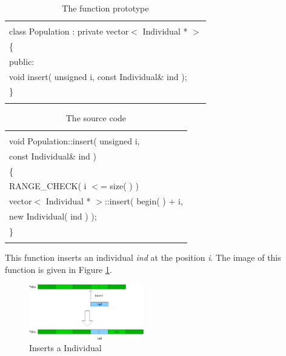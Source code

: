 \documentclass[twocolumn]{article}
\begin{document}
\begin{table}[h]
\begin{center}
\caption{The function prototype}
\label{FP2}
{\scriptsize
\begin{tabular}{|l|}\hline
\hspace*{7cm}\\
class Population : private vector$<$ Individual * $>$\\
\{\\
\hspace*{4mm} public:\\
\hspace*{8mm} void insert( unsigned i, const Individual\& ind );\\
\}\\
\hspace*{7cm}\\\hline
\end{tabular}
}
\end{center}
\end{table}

\begin{table}[h]
\begin{center}
\caption{The source code}
\label{SC2}
{\scriptsize
\begin{tabular}{|l|}\hline
\hspace*{7cm}\\
void Population::insert( unsigned i, \\
\hspace*{4mm} const Individual\& ind )\\
\{\\
\hspace*{4mm} RANGE\_CHECK( i $<$= size( ) )\\
\hspace*{4mm} vector$<$ Individual * $>$::insert( begin( ) + i, \\
\hspace*{8mm} new Individual( ind ) );\\
\}\\
\hspace*{7cm}\\\hline
\end{tabular}
}
\end{center}
\end{table}

\noindent
This function inserts an individual {\em ind} at the position {\em
i}. The image of this function is given in Figure \ref{InsertInd}.

\begin{figure}[h]
\begin{center}
\includegraphics[width=5cm]{004-4-1-insert1.eps}
\caption{Inserts a Individual}
\label{InsertInd}
\end{center}
\end{figure}
\end{document}
